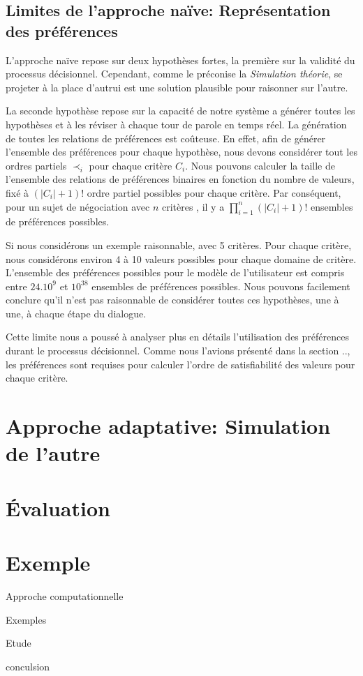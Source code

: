 		\subsection{Limites de l'approche naïve: Représentation des préférences}
			L'approche naïve repose sur deux hypothèses fortes, la première sur la validité du processus décisionnel. Cependant, comme le préconise la \emph{Simulation théorie}, se projeter à la place d'autrui est une solution plausible pour raisonner sur l'autre.
			
			La seconde hypothèse repose sur la capacité de notre système a générer toutes les hypothèses et à les réviser à chaque tour de parole en temps réel. La génération de toutes les relations de préférences est coûteuse. En effet, afin de générer l'ensemble des préférences pour chaque hypothèse, nous devons considérer tout les ordres partiels $\prec_i$ pour chaque critère $C_i$.
			Nous pouvons calculer la taille de l'ensemble des relations de préférences binaires en fonction du nombre de valeurs, fixé à $(|C_i|+1)! $ ordre partiel possibles pour chaque critère. Par conséquent, pour un sujet de négociation avec $n$ critères , il y a $\prod_{i=1}^n (|C_i|+1)!$ ensembles de préférences possibles.
			
			
			Si nous considérons un exemple raisonnable, avec 5 critères. Pour chaque critère, nous considérons environ 4 à 10 valeurs possibles pour chaque domaine de critère. L'ensemble des préférences possibles pour le modèle de l'utilisateur est compris entre $ 24.10 ^ 9 $ et $ 10 ^ {38} $ ensembles de préférences possibles.
			Nous pouvons facilement conclure qu'il n'est pas raisonnable de considérer toutes ces hypothèses, une à une, à chaque étape du dialogue.
			
			Cette limite nous a poussé à analyser plus en détails l'utilisation des préférences durant le processus décisionnel. Comme nous l'avions présenté dans la section .., les préférences sont requises pour calculer l'ordre de satisfiabilité des valeurs pour chaque critère. 

\section{Approche adaptative: Simulation de l'autre}
	
\section{Évaluation}

\section{Exemple}


Approche computationnelle

Exemples

Etude

conculsion